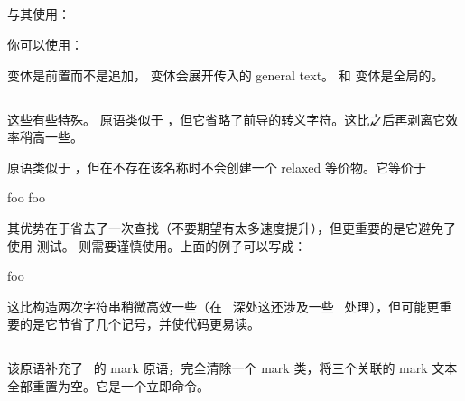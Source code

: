 \subsection{}

与其使用：

\begin{typing}
\toks0\expandafter{\the\toks0 foo}
\end{typing}

你可以使用：

\begin{typing}
\end{typing}

 变体是前置而不是追加， 变体会展开传入的 general text。 和  变体是全局的。

\subsection{}

这些有些特殊。 原语类似于 ，但它省略了前导的转义字符。这比之后再剥离它效率稍高一些。

 原语类似于 ，但在不存在该名称时不会创建一个 relaxed 等价物。它等价于

\begin{typing}
\ifcsname foo\endcsname
  \csname foo\endcsname
\fi
\end{typing}

其优势在于省去了一次查找（不要期望有太多速度提升），但更重要的是它避免了使用  测试。 则需要谨慎使用。上面的例子可以写成：

\begin{typing}
\ifcsname foo\endcsname
  \lastnamedcs
\fi
\end{typing}

这比构造两次字符串稍微高效一些（在 \LUATEX\ 深处这还涉及一些 \ 处理），但可能更重要的是它节省了几个记号，并使代码更易读。

\subsection{}


该原语补充了 \ETEX\ 的 mark 原语，完全清除一个 mark 类，将三个关联的 mark 文本全部重置为空。它是一个立即命令。

\begin{typing}
\end{typing}


